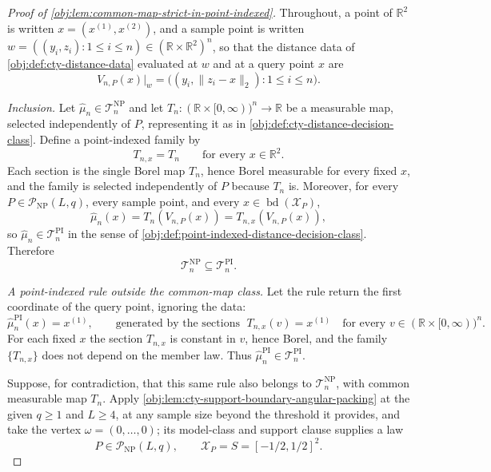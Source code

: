 \begin{proof}[Proof of \cref{obj:lem:common-map-strict-in-point-indexed}]
Throughout, a point of \(\mathbb R^2\) is written \(x=(x^{(1)},x^{(2)})\), and a sample point is written \(w=((y_i,z_i):1\leq i\leq n)\in(\mathbb R\times\mathbb R^2)^n\), so that the distance data of \cref{obj:def:cty-distance-data} evaluated at \(w\) and at a query point \(x\) are
\[
V_{n,P}(x)\big|_{w}
=
\bigl((y_i,\lVert z_i-x\rVert_2):1\leq i\leq n\bigr).
\]

\emph{Inclusion.}  Let \(\widehat\mu_n\in\mathcal T_n^{\mathrm{NP}}\) and let \(T_n:(\mathbb R\times[0,\infty))^n\to\mathbb R\) be a measurable map, selected independently of \(P\), representing it as in \cref{obj:def:cty-distance-decision-class}.  Define a point-indexed family by
\[
T_{n,x}=T_n
\qquad\text{for every }x\in\mathbb R^2 .
\]
Each section is the single Borel map \(T_n\), hence Borel measurable for every fixed \(x\), and the family is selected independently of \(P\) because \(T_n\) is.  Moreover, for every \(P\in\mathcal P_{\mathrm{NP}}(L,q)\), every sample point, and every \(x\in\operatorname{bd}(\mathcal X_P)\),
\[
\widehat\mu_n(x)=T_n(V_{n,P}(x))=T_{n,x}(V_{n,P}(x)),
\]
so \(\widehat\mu_n\in\mathcal T_n^{\mathrm{PI}}\) in the sense of \cref{obj:def:point-indexed-distance-decision-class}.  Therefore
\[
\mathcal T_n^{\mathrm{NP}}\subseteq \mathcal T_n^{\mathrm{PI}}.
\]

\emph{A point-indexed rule outside the common-map class.}  Let the rule return the first coordinate of the query point, ignoring the data:
\[
\widehat\mu_{n}^{\mathrm{PI}}(x)=x^{(1)},
\qquad\text{generated by the sections }\;
T_{n,x}(v)=x^{(1)}
\quad\text{for every }v\in(\mathbb R\times[0,\infty))^n .
\]
For each fixed \(x\) the section \(T_{n,x}\) is constant in \(v\), hence Borel, and the family \(\{T_{n,x}\}\) does not depend on the member law.  Thus \(\widehat\mu_n^{\mathrm{PI}}\in\mathcal T_n^{\mathrm{PI}}\).

Suppose, for contradiction, that this same rule also belongs to \(\mathcal T_n^{\mathrm{NP}}\), with common measurable map \(T_n\).  Apply \cref{obj:lem:cty-support-boundary-angular-packing} at the given \(q\geq1\) and \(L\geq4\), at any sample size beyond the threshold it provides, and take the vertex \(\omega=(0,\ldots,0)\); its model-class and support clause supplies a law
\[
P\in\mathcal P_{\mathrm{NP}}(L,q),
\qquad
\mathcal X_P=S=[-1/2,1/2]^2 .
\]


\end{proof}
